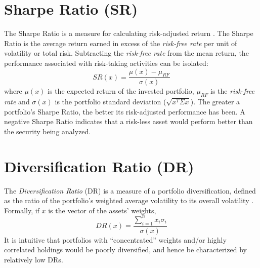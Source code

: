 \section{Sharpe Ratio (SR)}
The Sharpe Ratio is a measure for calculating risk-adjusted return \cite{sharpe}. The Sharpe Ratio is the average return earned in excess of the \textit{risk-free rate} per unit of volatility or total risk. Subtracting the \textit{risk-free rate} from the mean return, the performance associated with risk-taking activities can be isolated:
\begin{equation}\label{eq:SR}
SR(x) = \frac{\mu(x) - \mu_{RF}}{\sigma(x)}
\end{equation} 
where $\mu(x)$ is the expected return of the invested portfolio, $\mu_{RF}$ is the \textit{risk-free rate} and $\sigma(x)$ is the portfolio standard deviation ($\sqrt{x^T \Sigma x}$). The greater a portfolio's Sharpe Ratio, the better its risk-adjusted performance has been. A negative Sharpe Ratio indicates that a risk-less asset would perform better than the security being analyzed.

\section{Diversification Ratio (DR)}
The \textit{Diversification Ratio} (DR) is a measure of a portfolio diversification, defined as the ratio of the portfolio’s weighted
average volatility to its overall volatility \cite{diversification}. Formally, if $x$ is the vector of the assets' weights,
\begin{equation}\label{eq:dr}
DR(x) = \frac{\sum_{i=1}^{n}x_i\sigma_i}{\sigma(x)}
\end{equation}
It is intuitive that portfolios with “concentrated” weights and/or highly correlated holdings would be poorly diversified, and hence be characterized by relatively low DRs.

